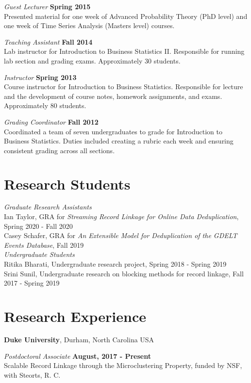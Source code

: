 \documentclass[margin,line]{res}
\begin{document}
\begin{resume}
{\em Guest Lecturer} \hfill {\bf Spring 2015}\\
Presented material for one week of Advanced Probability Theory (PhD level) and one week of Time Series Analysis (Masters level) courses.

{\em Teaching Assistant} \hfill {\bf Fall 2014}\\
Lab instructor for Introduction to Business Statistics II. Responsible for running lab section and grading exams. Approximately 30 students.

{\em Instructor} \hfill {\bf Spring 2013}\\
Course instructor for Introduction to Business Statistics. Responsible for lecture and the development of course notes, homework assignments, and exams. Approximately 80 students.

{\em Grading Coordinator} \hfill {\bf Fall 2012}\\
Coordinated a team of seven undergraduates to grade for Introduction to Business Statistics. Duties included creating a rubric each week and ensuring consistent grading across all sections.

\section{\sc Research Students}

{\em Graduate Research Assistants} \hfill \\
Ian Taylor, GRA for {\em Streaming Record Linkage for Online Data Deduplication}, Spring 2020 - Fall 2020 \\
Casey Schafer, GRA for {\em An Extensible Model for Deduplication of the GDELT Events Database}, Fall 2019 \\

{\em Undergraduate Students} \hfill \\
Ritika Bharati, Undergraduate research project, Spring 2018 - Spring 2019\\
Srini Sunil, Undergraduate research on blocking methods for record linkage, Fall 2017 - Spring 2019


\section{\sc Research Experience}
{\bf Duke University}, Durham, North Carolina USA

\vspace{-.3cm}
{\em Postdoctoral Associate} \hfill {\bf August, 2017 - Present}\\
Scalable Record Linkage through the Microclustering Property, funded by NSF, with Steorts, R. C.


\end{resume}
\end{document}
